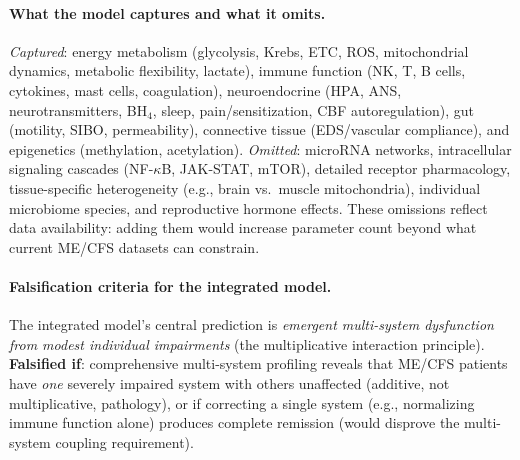 \paragraph{What the model captures and what it omits.}
\emph{Captured}: energy metabolism (glycolysis, Krebs, ETC, ROS, mitochondrial dynamics, metabolic flexibility, lactate), immune function (NK, T, B cells, cytokines, mast cells, coagulation), neuroendocrine (HPA, ANS, neurotransmitters, BH$_4$, sleep, pain/sensitization, CBF autoregulation), gut (motility, SIBO, permeability), connective tissue (EDS/vascular compliance), and epigenetics (methylation, acetylation). \emph{Omitted}: microRNA networks, intracellular signaling cascades (NF-$\kappa$B, JAK-STAT, mTOR), detailed receptor pharmacology, tissue-specific heterogeneity (e.g., brain vs.\ muscle mitochondria), individual microbiome species, and reproductive hormone effects. These omissions reflect data availability: adding them would increase parameter count beyond what current ME/CFS datasets can constrain.

\paragraph{Falsification criteria for the integrated model.}
The integrated model's central prediction is \emph{emergent multi-system dysfunction from modest individual impairments} (the multiplicative interaction principle). \textbf{Falsified if}: comprehensive multi-system profiling reveals that ME/CFS patients have \emph{one} severely impaired system with others unaffected (additive, not multiplicative, pathology), or if correcting a single system (e.g., normalizing immune function alone) produces complete remission (would disprove the multi-system coupling requirement).
